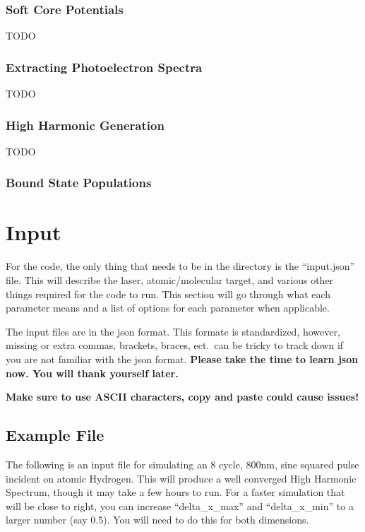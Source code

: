 \documentclass{article}
\begin{document}
\subsubsection{Soft Core Potentials} %
\label{ssub:soft_core_potentials}
TODO

\subsubsection{Extracting Photoelectron Spectra} %
\label{ssub:extracting_photoelectron_spectra}
TODO

\subsubsection{High Harmonic Generation} %
\label{ssub:high_harmonic_generation}
TODO

\subsubsection{Bound State Populations} %
\label{ssub:bound_state_populations}



\section{Input} %
\label{sec:input}

For the code, the only thing that needs to be in the directory is the ``input.json'' file. This will describe the laser, atomic/molecular target, and various other things required for the code to run. This section will go through what each parameter means and a list of options for each parameter when applicable.

The input files are in the json format. This formate is standardized, however, missing or extra commas, brackets, braces, ect.\ can be tricky to track down if you are not familiar with the json format. \textbf{Please take the time to learn json now. You will thank yourself later.}

\textbf{Make sure to use ASCII characters, copy and paste could cause issues!}

\subsection{Example File} %
\label{sub:example_file}
The following is an input file for simulating an 8 cycle, 800nm, sine squared pulse incident on atomic Hydrogen. This will produce a well converged High Harmonic Spectrum, though it may take a few hours to run. For a faster simulation that will be close to right, you can increase ``delta\_x\_max'' and ``delta\_x\_min'' to a larger number (say 0.5). You will need to do this for both dimensions.
\end{document}
